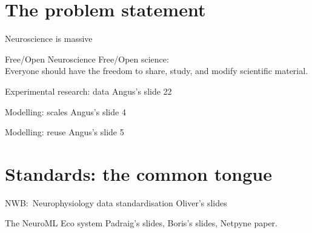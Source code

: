 \section{The problem statement}
\begin{frame}[c]{Neuroscience is massive}
  \begin{figure}[h]
    \centering
  \end{figure}
\end{frame}
\begin{frame}[c]{Free/Open Neuroscience}
  Free/Open science:\\\alert{Everyone} should have the freedom to \alert{share, study, and modify} scientific material.\\
  \pause{}
  \vspace{0.5cm}
\end{frame}
\begin{frame}[c]{Experimental research: data}
  Angus's slide 22
\end{frame}
\begin{frame}[c]{Modelling: scales}
  Angus's slide 4
\end{frame}
\begin{frame}[c]{Modelling: reuse}
  Angus's slide 5
\end{frame}
\section{Standards: the common tongue}
\begin{frame}[c]{NWB:\ Neurophysiology data standardisation}
  Oliver's slides
\end{frame}
\begin{frame}[c]{The NeuroML Eco system}
  Padraig's slides, Boris's slides, Netpyne paper.
\end{frame}
